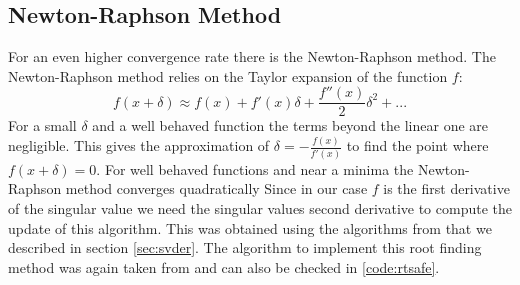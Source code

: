 \documentclass[a4paper, oneside]{thirdparty_stylesheets/discothesis}
\begin{document}
\subsection{Newton-Raphson Method}
For an even higher convergence rate there is the Newton-Raphson method.
The Newton-Raphson method relies on the Taylor expansion of the function $f$:
\begin{equation}
	f(x+\delta) \approx f(x) + f'(x)\delta + \frac{f''(x)}{2}\delta^2 + ...
\end{equation}
For a small $\delta$ and a well behaved function the terms beyond the linear one are negligible.
This gives the approximation of $\delta = -\frac{f(x)}{f'(x)}$ to find the point where $f(x+\delta)=0$.
For well behaved functions and near a minima the Newton-Raphson method converges quadratically \cite{traub2014analytic}
Since in our case $f$ is the first derivative of the singular value we need the singular values second derivative to compute the update of this algorithm.
This was obtained using the algorithms from \cite{doi:10.1002/nme.1620260202} that we described in section \ref{sec:svder}.
The algorithm to implement this root finding method was again taken from \cite{rf} and can also be checked in \ref{code:rtsafe}.
\end{document}

